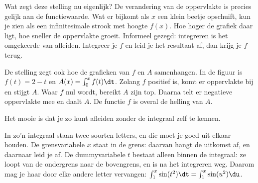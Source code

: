 Wat zegt deze stelling nu eigenlijk? De verandering van de oppervlakte is precies gelijk aan de functiewaarde. Wat er bijkomt als $x$ een klein beetje opschuift, kun je zien als een infinitesimale strook met hoogte $f(x)$. Hoe hoger de grafiek daar ligt, hoe sneller de oppervlakte groeit. Informeel gezegd: integreren is het omgekeerde van afleiden. Integreer je $f$ en leid je het resultaat af, dan krijg je $f$ terug.

De stelling zegt ook hoe de grafieken van $f$ en $A$ samenhangen. In de figuur is $f(t) = 2 - t$ en $A(x) = \int_0^x f(t)\dt$. Zolang $f$ positief is, komt er oppervlakte bij en stijgt $A$. Waar $f$ nul wordt, bereikt $A$ zijn top. Daarna telt er negatieve oppervlakte mee en daalt $A$. De functie $f$ is overal de helling van $A$.


Het mooie is dat je zo kunt afleiden zonder de integraal zelf te kennen.


In zo'n integraal staan twee soorten letters, en die moet je goed uit elkaar houden. De grensvariabele $x$ staat in de grens: daarvan hangt de uitkomst af, en daarnaar leid je af. De dummyvariabele $t$ bestaat alleen binnen de integraal: ze loopt van de ondergrens naar de bovengrens, en is na het integreren weg. Daarom mag je haar door elke andere letter vervangen: $\int_1^x \sin(t^2)\dt = \int_1^x \sin(u^2)\du$.

